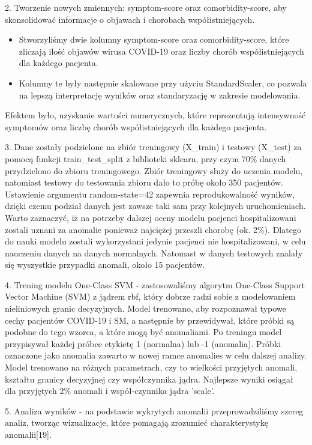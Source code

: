 \documentclass[a4paper,fleqn]{cas-dc}
\begin{document}
2. Tworzenie nowych zmiennych: symptom-score oraz comorbidity-score, aby skonsolidować informacje o objawach i chorobach współistniejących.
\begin{itemize} 
\item Stworzyliśmy dwie kolumny symptom-score oraz comorbidity-score, które zliczają ilość objawów wirusa COVID-19 oraz liczby chorób współistniejących dla każdego pacjenta.
\item  Kolumny te były następnie skalowane przy użyciu StandardScaler, co pozwala na lepszą interpretację wyników oraz standaryzację w zakresie modelowania.
\end{itemize}
Efektem było, uzyskanie wartości numerycznych, które reprezentują intensywność symptomów oraz liczbę chorób współistniejących dla każdego pacjenta.


3. Dane zostały podzielone na zbiór treningowy (X\_train) i testowy (X\_test) za pomocą funkcji train\_test\_split z biblioteki sklearn, przy czym 70\% danych przydzielono do zbioru treningowego. Zbiór treningowy służy do uczenia modelu, natomiast testowy do testowania zbioru dało to próbę około 350 pacjentów. Ustawienie argumentu random-state=42 zapewnia reprodukowalność wyników, dzięki czemu podział danych jest zawsze taki sam przy kolejnych uruchomieniach. Warto zaznaczyć, iż na potrzeby dalszej oceny modelu pacjenci hospitalizowani zostali uznani za anomalie ponieważ najciężej przeszli chorobę (ok. 2\%). Dlatego do nauki modelu zostali wykorzystani jedynie pacjenci nie hospitalizowani, w celu nauczeniu danych na danych normalnych.  Natomast w danych testowych znalały się wyszystkie przypadki anomali, około 15 pacjentów.

4. Trening modelu One-Class SVM - zastosowaliśmy algorytm One-Class Support Vector Machine (SVM) z jądrem rbf, który dobrze radzi sobie z modelowaniem nieliniowych granic decyzyjnych. Model trenowano, aby rozpoznawał typowe cechy pacjentów COVID-19 i SM, a następnie by przewidywał, które próbki są podobne do tego wzorca, a które mogą być anomaliami. Po treningu model przypisywał każdej próbce etykietę 1 (normalna) lub -1 (anomalia). Próbki oznaczone jako anomalia zawarto w nowej ramce anomalies w celu dalszej analizy. Model trenowano na różnych parametrach, czy to wielkości przyjętych anomali, kształtu granicy decyzyjnej czy współczynnika jądra. Najlepsze wyniki osiągał dla przyjętych 2\% anomali i współ-czynnika jądra 'scale'.

5. Analiza wyników - na podstawie wykrytych anomalii przeprowadziliśmy szereg analiz, tworząc wizualizacje, które pomagają zrozumieć charakterystykę anomalii[19].
\end{document}
